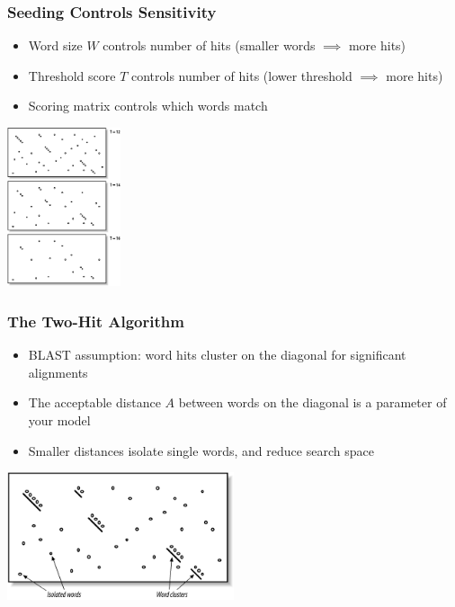\begin{frame}
  \frametitle{Seeding Controls Sensitivity}
  \begin{itemize}
    \item Word size $W$ controls number of hits (smaller words $\implies$ more hits)
    \item Threshold score $T$ controls number of hits (lower threshold $\implies$ more hits)
    \item Scoring matrix controls which words match
  \end{itemize}
  \begin{center}
    \includegraphics[width=0.25\textwidth]{images/seeding_t} 
  \end{center}    
\end{frame}

\begin{frame}
  \frametitle{The Two-Hit Algorithm}
  \begin{itemize}
    \item BLAST assumption: word hits cluster on the diagonal for significant alignments
    \item The acceptable distance $A$ between words on the diagonal is a parameter of your model
    \item Smaller distances isolate single words, and reduce search space
  \end{itemize}
  \begin{center}
    \includegraphics[width=0.5\textwidth]{images/two_hit} 
  \end{center}    
\end{frame}
